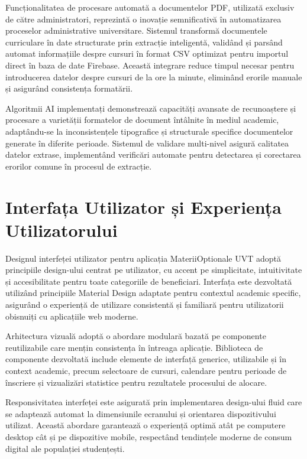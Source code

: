 \documentclass[12pt,a4paper]{report}
\begin{document}
Funcționalitatea de procesare automată a documentelor PDF, utilizată exclusiv de către administratori, reprezintă o inovație semnificativă în automatizarea proceselor administrative universitare. Sistemul transformă documentele curriculare în date structurate prin extracție inteligentă, validând și parsând automat informațiile despre cursuri în format CSV optimizat pentru importul direct în baza de date Firebase. Această integrare reduce timpul necesar pentru introducerea datelor despre cursuri de la ore la minute, eliminând erorile manuale și asigurând consistența formatării.

Algoritmii AI implementați demonstrează capacități avansate de recunoaștere și procesare a varietății formatelor de document întâlnite în mediul academic, adaptându-se la inconsistențele tipografice și structurale specifice documentelor generate în diferite perioade. Sistemul de validare multi-nivel asigură calitatea datelor extrase, implementând verificări automate pentru detectarea și corectarea erorilor comune în procesul de extracție.

\section{Interfața Utilizator și Experiența Utilizatorului}

Designul interfeței utilizator pentru aplicația MateriiOptionale UVT adoptă principiile design-ului centrat pe utilizator, cu accent pe simplicitate, intuitivitate și accesibilitate pentru toate categoriile de beneficiari. Interfața este dezvoltată utilizând principiile Material Design adaptate pentru contextul academic specific, asigurând o experiență de utilizare consistentă și familiară pentru utilizatorii obisnuiți cu aplicațiile web moderne.

Arhitectura vizuală adoptă o abordare modulară bazată pe componente reutilizabile care mențin consistența în întreaga aplicație. Biblioteca de componente dezvoltată include elemente de interfață generice, utilizabile și în context academic, precum selectoare de cursuri, calendare pentru perioade de înscriere și vizualizări statistice pentru rezultatele procesului de alocare.

Responsivitatea interfeței este asigurată prin implementarea design-ului fluid \cite{responsive-design} care se adaptează automat la dimensiunile ecranului și orientarea dispozitivului utilizat. Această abordare garantează o experiență optimă atât pe computere desktop cât și pe dispozitive mobile, respectând tendințele moderne de consum digital ale populației studențești.
\end{document}
